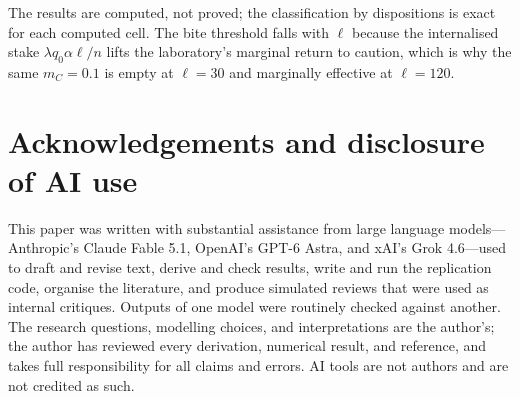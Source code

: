 \documentclass[11pt]{article}
\theoremstyle{plain}
\theoremstyle{definition}
\theoremstyle{remark}
\begin{document}
The results are computed, not proved; the classification by dispositions is exact for each computed cell. The bite threshold falls with $\ell$ because the internalised stake $\lambda q_0\alpha\ell/n$ lifts the laboratory's marginal return to caution, which is why the same $m_C=0.1$ is empty at $\ell=30$ and marginally effective at $\ell=120$.

\section*{Acknowledgements and disclosure of AI use}
This paper was written with substantial assistance from large language models---Anthropic's Claude Fable 5.1, OpenAI's GPT-6 Astra, and xAI's Grok 4.6---used to draft and revise text, derive and check results, write and run the replication code, organise the literature, and produce simulated reviews that were used as internal critiques. Outputs of one model were routinely checked against another. The research questions, modelling choices, and interpretations are the author's; the author has reviewed every derivation, numerical result, and reference, and takes full responsibility for all claims and errors. AI tools are not authors and are not credited as such.
\end{document}
